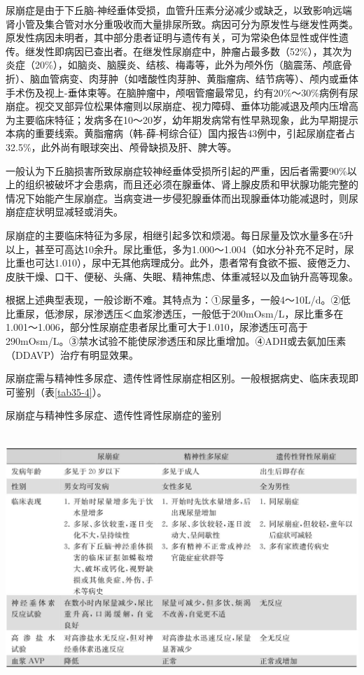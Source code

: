 尿崩症是由于下丘脑-神经垂体受损，血管升压素分泌减少或缺乏，以致影响远端肾小管及集合管对水分重吸收而大量排尿所致。病因可分为原发性与继发性两类。原发性病因未明者，其中部分患者证明与遗传有关，可为常染色体显性或伴性遗传。继发性即病因已查出者。在继发性尿崩症中，肿瘤占最多数（52\%），其次为炎症（20\%），如脑炎、脑膜炎、结核、梅毒等，此外为颅外伤（脑震荡、颅底骨折）、脑血管病变、肉芽肿（如嗜酸性肉芽肿、黄脂瘤病、结节病等）、颅内或垂体手术伤及视上-垂体束等。在脑肿瘤中，颅咽管瘤最常见，约有20\%～30\%病例有尿崩症。视交叉部异位松果体瘤则以尿崩症、视力障碍、垂体功能减退及颅内压增高为主要临床特征；发病多在10～20岁，幼年期发病常有性早熟现象，此为早期提示本病的重要线索。黄脂瘤病（韩-薛-柯综合征）国内报告43例中，引起尿崩症者占32.5\%，此外尚有眼球突出、颅骨缺损及肝、脾大等。

一般认为下丘脑损害所致尿崩症较神经垂体受损所引起的严重，因后者需要90\%以上的组织被破坏才会患病，而且还必须在腺垂体、肾上腺皮质和甲状腺功能完整的情况下始能产生尿崩症。当病变进一步侵犯腺垂体而出现腺垂体功能减退时，则尿崩症症状明显减轻或消失。

尿崩症的主要临床特征为多尿，相继引起多饮和烦渴。每日尿量及饮水量多在5升以上，甚至可高达10余升。尿比重低，多为1.000～1.004（如水分补充不足时，尿比重也可达1.010），尿中无其他病理成分。此外，患者常有食欲不振、疲倦乏力、皮肤干燥、口干、便秘、头痛、失眠、精神焦虑、体重减轻以及血钠升高等现象。

根据上述典型表现，一般诊断不难。其特点为：①尿量多，一般4～10L/d。②低比重尿，低渗尿，尿渗透压＜血浆渗透压，一般低于200mOsm/L，尿比重多在1.001～1.006，部分性尿崩症患者尿比重可大于1.010，尿渗透压可高于290mOsm/L。③禁水试验不能使尿渗透压和尿比重增加。④ADH或去氨加压素（DDAVP）治疗有明显效果。

尿崩症需与精神性多尿症、遗传性肾性尿崩症相区别。一般根据病史、临床表现即可鉴别（表\ref{tab35-4}）。

\begin{table}[htbp]
\centering
\caption{尿崩症与精神性多尿症、遗传性肾性尿崩症的鉴别}
\label{tab35-4}
\includegraphics[width=5.86458in,height=3.72917in]{./images/Image00214.jpg}
\end{table}

